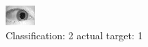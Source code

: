 \begin{figure}[h!]
\begin{center}
\includegraphics[width=0.60\columnwidth]{figures/ID1452_class_2_target_1.png}
\end{center}
\caption{ Classification: 2 actual target: 1}
\label{fig:ID1452_class_2_target_1}
\end{figure}
